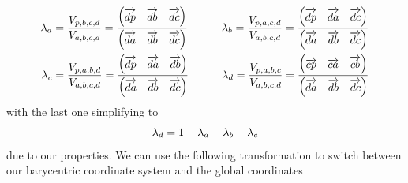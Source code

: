 \begin{align}
    \lambda_a &= \dfrac{V_{p, b, c, d}}{V_{a, b, c, d}} = \dfrac{\begin{pmatrix}
     \overrightarrow{d p} & \overrightarrow{d b} & \overrightarrow{d c}   
    \end{pmatrix}}{\begin{pmatrix}
    \overrightarrow{d a} & \overrightarrow{d b} & \overrightarrow{d c}      
    \end{pmatrix}} \qquad
    &\lambda_b = \dfrac{V_{p, a, c, d}}{V_{a, b, c, d}} = \dfrac{\begin{pmatrix}
     \overrightarrow{d p} & \overrightarrow{d a} & \overrightarrow{d c}   
    \end{pmatrix}}{\begin{pmatrix}
    \overrightarrow{d a} & \overrightarrow{d b} & \overrightarrow{d c}      
    \end{pmatrix}}\\
    \lambda_c &= \dfrac{V_{p, a, b, d}}{V_{a, b, c, d}}= \dfrac{\begin{pmatrix}
     \overrightarrow{d p} & \overrightarrow{d a} & \overrightarrow{d b}   
    \end{pmatrix}}{\begin{pmatrix}
    \overrightarrow{d a} & \overrightarrow{d b} & \overrightarrow{d c}      
    \end{pmatrix}} \qquad
    &\lambda_d = \dfrac{V_{p, a, b, c}}{V_{a, b, c, d}}= \dfrac{\begin{pmatrix}
     \overrightarrow{c p} & \overrightarrow{c a} & \overrightarrow{c b}   
    \end{pmatrix}}{\begin{pmatrix}
    \overrightarrow{d a} & \overrightarrow{d b} & \overrightarrow{d c}      
    \end{pmatrix}}
\end{align}
with the last one simplifying to
\begin{equation}
\label{eq:baryNorm}
    \lambda_d = 1 - \lambda_a - \lambda_b - \lambda_c
\end{equation}
due to our properties.
We can use the following transformation to switch between our barycentric coordinate system and the global coordinates
